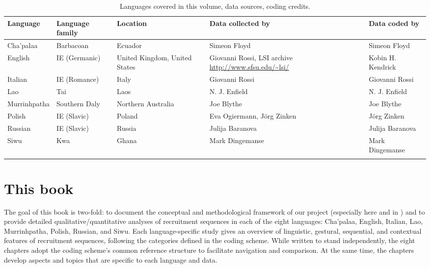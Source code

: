 \documentclass[output=paper,modfonts,nonflat]{langsci/langscibook}
\begin{document}
\begin{table}
\small
\begin{tabularx}{\textwidth}{llQQQ}
\lsptoprule
{Language} & {Language family} & {Location} & {Data collected by} & {Data coded by}\\
\midrule
Cha’palaa & Barbacoan & Ecuador & Simeon Floyd & Simeon Floyd\\
\tablevspace
English & IE (Germanic) & United Kingdom, United States & Giovanni Rossi, LSI archive \url{http://www.sfsu.edu/~lsi/} & Kobin H. Kendrick\\
\tablevspace
Italian & IE (Romance) & Italy & Giovanni Rossi & Giovanni Rossi\\
\tablevspace
Lao & Tai & Laos & N. J. Enfield & N. J. Enfield\\
\tablevspace
Murrinhpatha & Southern Daly & Northern Australia & Joe Blythe & Joe Blythe\\
\tablevspace
Polish & IE (Slavic) & Poland & Eva Ogiermann, Jörg Zinken & Jörg Zinken\\
\tablevspace
Russian & IE (Slavic) & Russia & Julija Baranova & Julija Baranova\\
\tablevspace
Siwu & Kwa & Ghana & Mark Dingemanse & Mark Dingemanse\\
\lspbottomrule
\end{tabularx}
\caption{Languages covered in this volume, data sources, coding credits.\label{tab:intro:1}}
\end{table}

\section{This book}\label{sec:intro:8}

The goal of this book is two-fold: to document the conceptual and methodological framework of our project (especially here and in ) and to provide detailed qualitative/quantitative analyses of recruitment sequences in each of the eight languages: Cha’palaa, English, Italian, Lao, Murrinhpatha, Polish, Russian, and Siwu. Each language-specific study gives an overview of linguistic, gestural, sequential, and contextual features of recruitment sequences, following the categories defined in the coding scheme. While written to stand independently, the eight chapters adopt the coding scheme’s common reference structure to facilitate navigation and comparison. At the same time, the chapters develop aspects and topics that are specific to each language and data.
\end{document}
